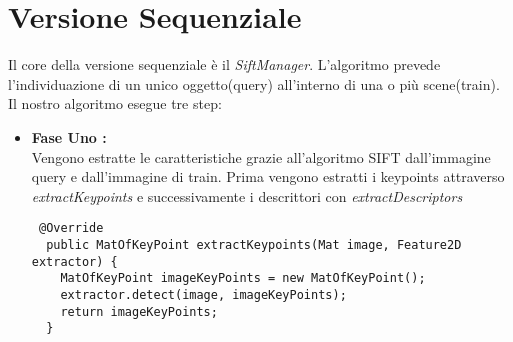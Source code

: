 \section{Versione Sequenziale}
Il core della versione sequenziale è il \emph{\textit{SiftManager}}. L'algoritmo prevede l'individuazione di un unico oggetto(query) all'interno di una o più scene(train). Il nostro algoritmo esegue tre step:
\begin{itemize}
\item \textbf{Fase Uno :}\\
Vengono estratte le caratteristiche grazie all'algoritmo SIFT dall'immagine query e dall'immagine di train.
Prima vengono estratti i keypoints attraverso \emph{\textit{extractKeypoints}} e successivamente i descrittori con \emph{\textit{extractDescriptors}}
\begin{lstlisting}
 @Override
  public MatOfKeyPoint extractKeypoints(Mat image, Feature2D extractor) {
    MatOfKeyPoint imageKeyPoints = new MatOfKeyPoint();
    extractor.detect(image, imageKeyPoints);
    return imageKeyPoints;
  }


\end{lstlisting}
\end{itemize}
